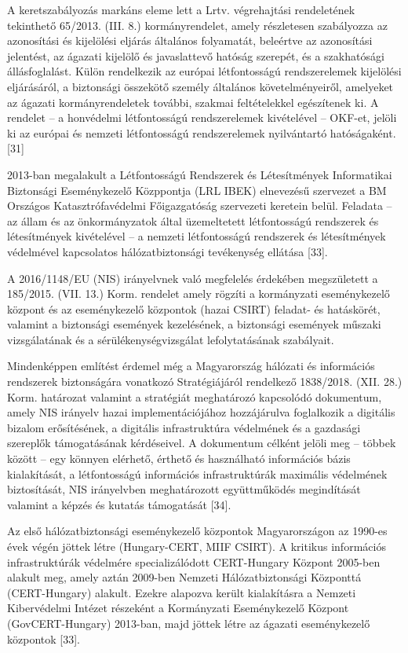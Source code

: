 \documentclass[12pt,magyar,a4paper,oneside]{scrreprt}
\begin{document}
A keretszabályozás markáns eleme lett a Lrtv. végrehajtási rendeletének
tekinthető 65/2013. (III. 8.) kormányrendelet, amely részletesen
szabályozza az azonosítási és kijelölési eljárás általános folyamatát,
beleértve az azonosítási jelentést, az ágazati kijelölő és javaslattevő
hatóság szerepét, és a szakhatósági állásfoglalást. Külön rendelkezik az
európai létfontosságú rendszerelemek kijelölési eljárásáról, a
biztonsági összekötő személy általános követelményeiről, amelyeket az
ágazati kormányrendeletek további, szakmai feltételekkel egészítenek ki.
A rendelet -- a honvédelmi létfontosságú rendszerelemek kivételével --
OKF-et, jelöli ki az európai és nemzeti létfontosságú rendszerelemek
nyilvántartó hatóságaként. {[}31{]}

2013-ban megalakult a Létfontosságú Rendszerek és Létesítmények
Informatikai Biztonsági Eseménykezelő Közppontja (LRL IBEK) elnevezésű
szervezet a BM Országos Katasztrófavédelmi Főigazgatóság szervezeti
keretein belül. Feladata -- az állam és az önkormányzatok által
üzemeltetett létfontosságú rendszerek és létesítmények kivételével -- a
nemzeti létfontosságú rendszerek és létesítmények védelmével kapcsolatos
hálózatbiztonsági tevékenység ellátása {[}33{]}.

A 2016/1148/EU (NIS) irányelvnek való megfelelés érdekében megszületett
a 185/2015. (VII. 13.) Korm. rendelet amely rögzíti a kormányzati
eseménykezelő központ és az eseménykezelő központok (hazai CSIRT)
feladat- és hatáskörét, valamint a biztonsági események kezelésének, a
biztonsági események műszaki vizsgálatának és a sérülékenységvizsgálat
lefolytatásának szabályait.

Mindenképpen említést érdemel még a Magyarország hálózati és információs
rendszerek biztonságára vonatkozó Stratégiájáról rendelkező 1838/2018.
(XII. 28.) Korm. határozat valamint a stratégiát meghatározó kapcsolódó
dokumentum, amely NIS irányelv hazai implementációjához hozzájárulva
foglalkozik a digitális bizalom erősítésének, a digitális infrastruktúra
védelmének és a gazdasági szereplők támogatásának kérdéseivel. A
dokumentum célként jelöli meg -- többek között -- egy könnyen elérhető,
érthető és használható információs bázis kialakítását, a létfontosságú
információs infrastruktúrák maximális védelmének biztosítását, NIS
irányelvben meghatározott együttműködés megindítását valamint a képzés
és kutatás támogatását {[}34{]}.

Az első hálózatbiztonsági eseménykezelő központok Magyarországon az
1990-es évek végén jöttek létre (Hungary-CERT, MIIF CSIRT). A kritikus
információs infrastruktúrák védelmére specializálódott CERT-Hungary
Központ 2005-ben alakult meg, amely aztán 2009-ben Nemzeti
Hálózatbiztonsági Központtá (CERT-Hungary) alakult. Ezekre alapozva
került kialakításra a Nemzeti Kibervédelmi Intézet részeként a
Kormányzati Eseménykezelő Központ (GovCERT-Hungary) 2013-ban, majd
jöttek létre az ágazati eseménykezelő központok {[}33{]}.
\end{document}

